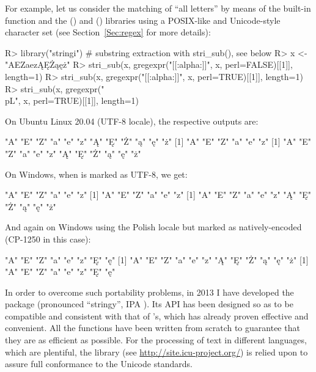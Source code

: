 \documentclass[nojss]{jss}
\begin{document}
For example, let us consider the matching
of ``all letters'' by means of the built-in  function
and the  ()
and  () libraries
using a POSIX-like and Unicode-style character set
(see Section~\ref{Sec:regex} for more details):

\begin{Schunk}
\begin{Sinput}
R> library("stringi")  # substring extraction with stri_sub(), see below
R> x <- "AEZaezĄĘŻąęż"
R> stri_sub(x, gregexpr("[[:alpha:]]", x, perl=FALSE)[[1]], length=1)
R> stri_sub(x, gregexpr("[[:alpha:]]", x, perl=TRUE)[[1]],  length=1)
R> stri_sub(x, gregexpr("\\p{L}", x, perl=TRUE)[[1]],       length=1)
\end{Sinput}
\end{Schunk}

On Ubuntu Linux 20.04 (UTF-8 locale), the respective outputs are:

\begin{Schunk}
\begin{Soutput}
[1] "A" "E" "Z" "a" "e" "z" "Ą" "Ę" "Ż" "ą" "ę" "ż"
[1] "A" "E" "Z" "a" "e" "z"
[1] "A" "E" "Z" "a" "e" "z" "Ą" "Ę" "Ż" "ą" "ę" "ż"
\end{Soutput}
\end{Schunk}

On Windows, when  is marked as UTF-8, we get:

\begin{Schunk}
\begin{Soutput}
[1] "A" "E" "Z" "a" "e" "z"
[1] "A" "E" "Z" "a" "e" "z"
[1] "A" "E" "Z" "a" "e" "z" "Ą" "Ę" "Ż" "ą" "ę" "ż"
\end{Soutput}
\end{Schunk}

And again on Windows using the Polish locale
but  marked as natively-encoded (CP-1250 in this case):

\begin{Schunk}
\begin{Soutput}
[1] "A" "E" "Z" "a" "e" "z" "Ę" "ę"
[1] "A" "E" "Z" "a" "e" "z" "Ą" "Ę" "Ż" "ą" "ę" "ż"
[1] "A" "E" "Z" "a" "e" "z" "Ę" "ę"
\end{Soutput}
\end{Schunk}



In order to overcome such portability problems, in 2013 I have developed
the  package (pronounced ``stringy'',
IPA \textipa{[{stringi}]}).
Its API has been designed so as to be compatible and consistent with that
of 's, which has already proven effective and convenient.
All the functions have been written from scratch to
guarantee that they are as efficient as possible.
For the processing of text in different languages,
which are plentiful, the  library
(see \url{http://site.icu-project.org/}) is relied upon to assure
full conformance to the Unicode standards.
\end{document}

